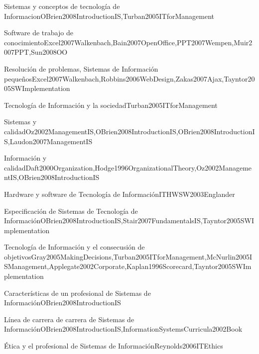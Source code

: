 \begin{LU1}{Sistemas y conceptos de tecnología de Informacion}{OBrien2008IntroductionIS,Turban2005ITforManagement}{}
\begin{LU2}{Software de trabajo de conocimiento}{Excel2007Walkenbach,Bain2007OpenOffice,PPT2007Wempen,Muir2007PPT,Sun2008OO}{}
\begin{LU3}{Resolución de problemas, Sistemas de Información pequeños}{Excel2007Walkenbach,Robbins2006WebDesign,Zakas2007Ajax,Tayntor2005SWImplementation}{}
\begin{LU4}{Tecnología de Información y la sociedad}{Turban2005ITforManagement}{}
\begin{LU5}{Sistemas y calidad}{Oz2002ManagementIS,OBrien2008IntroductionIS,OBrien2008IntroductionIS,Laudon2007ManagementIS}{}
\begin{LU6}{Información y calidad}{Daft2000Organization,Hodge1996OrganizationalTheory,Oz2002ManagementIS,OBrien2008IntroductionIS}{}
\begin{LU7}{Hardware y software de Tecnología de Información}{ITHWSW2003Englander}{}
\begin{LU8}{Especificación de Sistemas de Tecnología de Información}{OBrien2008IntroductionIS,Stair2007FundamentalsIS,Tayntor2005SWImplementation}{}
\begin{LU9}{Tecnología de Información y el consecusión de objetivos}{Gray2005MakingDecisions,Turban2005ITforManagement,McNurlin2005ISManagement,Applegate2002Corporate,Kaplan1996Scorecard,Tayntor2005SWImplementation}{}
\begin{LU10}{Características de un profesional de Sistemas de Información}{OBrien2008IntroductionIS}{}
\begin{LU11}{Línea de carrera de carrera de Sistemas de Información}{OBrien2008IntroductionIS,InformationSystemsCurricula2002Book}{}
\begin{LU12}{Ética y el profesional de Sistemas de Información}{Reynolds2006ITEthics}{}
\end{LU12}
\end{LU11}
\end{LU10}
\end{LU9}
\end{LU8}
\end{LU7}
\end{LU6}
\end{LU5}
\end{LU4}
\end{LU3}
\end{LU2}
\end{LU1}
